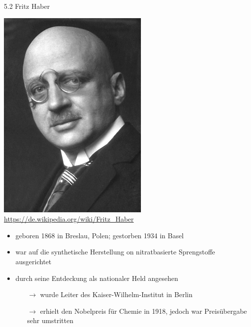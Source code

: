 \documentclass[
    aspectratio=1610
    ]{beamer}
\begin{document}
    \begin{frame}{5.2 Fritz Haber}
        \begin{minipage}{4.25cm}
            \includegraphics[scale=.42]{figures/Fritz_Haber.png}
            \tiny\color{gray}\url{https://de.wikipedia.org/wiki/Fritz_Haber}
        \end{minipage}
        \begin{minipage}{9.25cm}
            \begin{itemize}
                \item geboren 1868 in Breslau, Polen; gestorben 1934 in Basel
                \item war auf die synthetische Herstellung on nitratbasierte Sprengstoffe ausgerichtet
                \item durch seine Entdeckung als nationaler Held angesehen
                \begin{itemize}
                    \item[$\rightarrow$] wurde Leiter des Kaiser-Wilhelm-Institut in Berlin
                    \item[$\rightarrow$] erhielt den Nobelpreis für Chemie in 1918, jedoch war Preisübergabe sehr umstritten
                \end{itemize}
            \end{itemize}
        \end{minipage}
    \end{frame}
\end{document}

